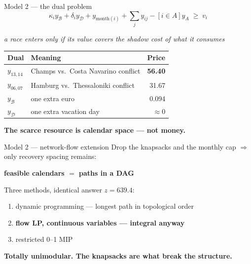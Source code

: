 \documentclass[10pt,aspectratio=169]{beamer}
\newcommand{\speakernote}[1]{}
\newcommand{\takeaway}[1]{\vspace{2pt}\begin{center}\small\textbf{#1}\end{center}}
\begin{document}
\speakernote{m2_branch_bound}

\begin{frame}{Model 2 --- the dual problem}
\[
\kappa_i y_\mathcal{B} + \delta_i y_\mathcal{D} + y_{\text{month}(i)}
+ \sum_{j} y_{ij} - [i \in A] y_A \;\ge\; v_i
\]
\begin{center}\small
\emph{a race enters only if its value covers the shadow cost of what it consumes}
\end{center}
\vspace{4pt}
\begin{center}\small
\begin{tabular}{llr}
\toprule
Dual & Meaning & Price\\
\midrule
$y_{13,14}$ & Champs vs.\ Costa Navarino conflict & \textbf{56.40}\\
$y_{06,07}$ & Hamburg vs.\ Thessaloniki conflict & 31.67\\
$y_\mathcal{B}$ & one extra euro & 0.094\\
$y_\mathcal{D}$ & one extra vacation day & $\approx 0$\\
\bottomrule
\end{tabular}
\end{center}
\takeaway{The scarce resource is calendar space --- not money.}
\end{frame}

\speakernote{m2_dual}

\begin{frame}{Model 2 --- network-flow extension}
Drop the knapsacks and the monthly cap $\Rightarrow$ only recovery spacing remains:
\begin{center}
\textbf{feasible calendars $=$ paths in a DAG}
\end{center}
\vspace{6pt}
Three methods, identical answer $z = 639.4$:
\begin{enumerate}\itemsep4pt
  \item dynamic programming --- longest path in topological order
  \item \textbf{flow LP, continuous variables --- integral anyway}
  \item restricted 0--1 MIP
\end{enumerate}
\takeaway{Totally unimodular. The knapsacks are what break the structure.}
\end{frame}

\speakernote{m2_network}
\end{document}
